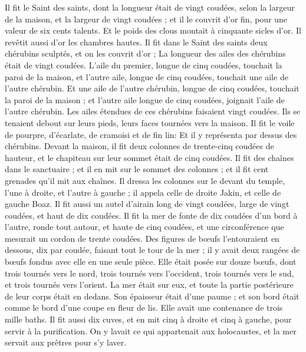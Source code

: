 \begin{multicols}{2}
Il fit le Saint des saints, dont la longueur était de vingt coudées, selon la largeur de la maison, et la largeur de vingt coudées ; et il le couvrit d'or fin, pour une valeur de six cents talents.
Et le poids des clous montait à cinquante sicles d'or. Il revêtit aussi d'or les chambres hautes.
Il fit dans le Saint des saints deux chérubins sculptés, et on les couvrit d'or ;
La longueur des ailes des chérubins était de vingt coudées. L'aile du premier, longue de cinq coudées, touchait la paroi de la maison, et l'autre aile, longue de cinq coudées, touchait une aile de l'autre chérubin.
Et une aile de l'autre chérubin, longue de cinq coudées, touchait la paroi de la maison ; et l'autre aile longue de cinq coudées, joignait l'aile de l'autre chérubin.
Les ailes étendues de ces chérubins faisaient vingt coudées. Ils se tenaient debout sur leurs pieds, leurs faces tournées vers la maison.
Il fit le voile de pourpre, d'écarlate, de cramoisi et de fin lin: Et il y représenta par dessus des chérubins.
Devant la maison, il fit deux colonnes de trente-cinq coudées de hauteur, et le chapiteau sur leur sommet était de cinq coudées.
Il fit des chaînes dans le sanctuaire ; et il en mit sur le sommet des colonnes ; et il fit cent grenades qu'il mit aux chaînes.
Il dressa les colonnes sur le devant du temple, l'une à droite, et l'autre à gauche ; il appela celle de droite Jakin, et celle de gauche Boaz.
\VerseOne{}Il fit aussi un autel d'airain long de vingt coudées, large de vingt coudées, et haut de dix coudées.
Il fit la mer de fonte de dix coudées d'un bord à l'autre, ronde tout autour, et haute de cinq coudées, et une circonférence que mesurait un cordon de trente coudées.
Des figures de bœufs l'entouraient en dessous, dix par coudée, faisant tout le tour de la mer ; il y avait deux rangées de bœufs fondus avec elle en une seule pièce.
Elle était posée sur douze bœufs, dont trois tournés vers le nord, trois tournés vers l'occident, trois tournés vers le sud, et trois tournés vers l'orient. La mer était sur eux, et toute la partie postérieure de leur corps était en dedans.
Son épaisseur était d'une paume ; et son bord était comme le bord d'une coupe en fleur de lis. Elle avait une contenance de trois mille baths.
Il fit aussi dix cuves, et en mit cinq à droite et cinq à gauche, pour servir à la purification. On y lavait ce qui appartenait aux holocaustes, et la mer servait aux prêtres pour s'y laver.

\end{multicols}
